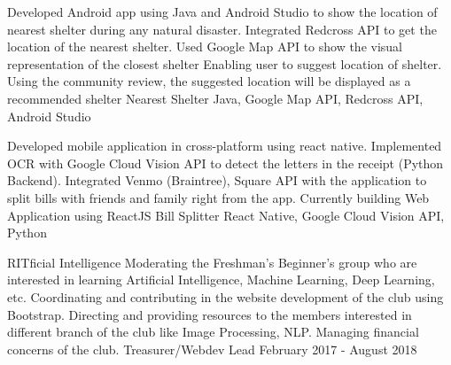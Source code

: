 \documentclass[]{awesome-cv}
\begin{document}
\vspace{-7mm}
\begin{cventries}
	\cventry
	{Developed Android app using Java and Android Studio to show the location of nearest shelter during any natural disaster. Integrated Redcross API to get the location of the nearest shelter. Used Google Map API to show the visual representation of the closest shelter Enabling user to suggest location of shelter. Using the community review, the suggested location will be displayed as a recommended shelter}
	{Nearest Shelter}
	{Java, Google Map API, Redcross API, Android Studio}
	{}
	{}
	
	\vspace{-5mm}
	\cventry
	{Developed mobile application in cross-platform using react native. Implemented OCR with Google Cloud Vision API to detect the letters in the receipt (Python Backend). Integrated Venmo (Braintree), Square API with the application to split bills with friends and family right from the app. Currently building Web Application using ReactJS}
	{Bill Splitter}
	{React Native, Google Cloud Vision API, Python}
	{}
	{}
	
	\vspace{-5mm}
\end{cventries}
\begin{cvhonors}
	\cvhonor
	{RITficial Intelligence}
	{Moderating the Freshman’s Beginner’s group who are interested in learning Artificial Intelligence, Machine Learning, Deep Learning, etc. Coordinating and contributing in the website development of the club using Bootstrap. Directing and providing resources to the members interested in different branch of the club like Image Processing, NLP. Managing financial concerns of the club.}
	{Treasurer/Webdev Lead}
	{February 2017 - August 2018}
\end{cvhonors}
\ 
\end{document}
